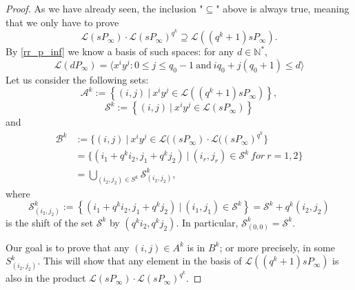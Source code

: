 \documentclass[a4paper]{article}
\newcommand{\calA}{\mathcal{A}}
\newcommand{\calB}{\mathcal{B}}
\newcommand{\calS}{\mathcal{S}}
\newcommand{\calL}{\mathcal{L}}
\begin{document}
\begin{proof}
As we have already seen, the inclusion "$\subseteq$" above is always true, meaning that we only have to prove 
\[\calL(sP_{\infty}) \cdot \calL(sP_{\infty})^{q^k} \supseteq \calL((q^k+1)sP_{\infty}).\]
By \eqref{rr_p_inf} we know a basis of such spaces: for any $d \in \mathbb{N}^*$,
\[\calL(dP_{\infty}) = \langle x^iy^j : 0 \leq j \leq q_0-1 \ \mathrm{and} \ iq_0+j(q_0+1) \leq d \rangle \]
Let us consider the following sets:
\[\calA^k := \left\{(i,j) \ | \ x^iy^j \in \calL((q^k+1)sP_{\infty})\right\},\]
\[\calS^k := \left\{(i,j) \ | \ x^iy^j \in \calL(sP_{\infty})\right\}\]
and
\begin{align*}
\calB^k &:= \{(i,j) \ | \ x^iy^j \in \calL((sP_{\infty}) \cdot \calL((sP_{\infty})^{q^k} \} \\
&= \{(i_1+q^ki_2,j_1+q^kj_2) \ | \ (i_r,j_r) \in \calS^k \ for \ r=1,2\} \\
&= \bigcup_{(i_2,j_2)\in S^k} \calS^k_{(i_2,j_2)},
\end{align*}
where 
\[ \calS^k_{(i_2,j_2)} := \left\{(i_1+q^ki_2,j_1+q^kj_2) \ | \ (i_1,j_1) \in \calS^k\right\}=\calS^k+q^k(i_2,j_2)\]
is the shift of the set $\calS^k$ by $(q^ki_2,q^kj_2)$. In particular, $\calS^k_{(0,0)}=\calS^k$.


Our goal is to prove that any $(i,j) \in A^k$ is in $B^k$; or more precisely, in some $S^k_{(i_2,j_2)}$. This will show that any element in the basis of $\calL((q^k+1)sP_{\infty})$ is also in the product $\calL(sP_{\infty}) \cdot \calL(sP_{\infty})^{q^k}$.



\end{proof}
\end{document}
